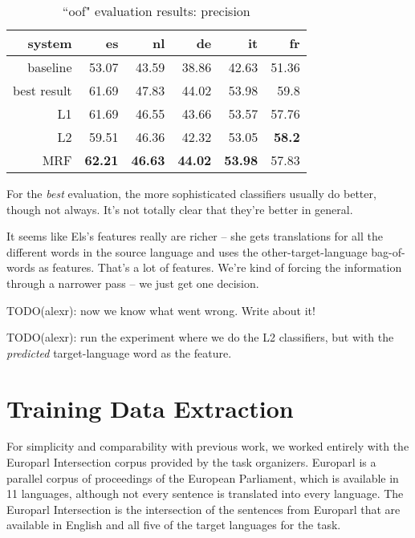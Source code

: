 \documentclass[11pt,letterpaper]{article}
\begin{document}
\begin{table*}[t!]
  \begin{center}
    \begin{tabular}{|r|r|r|r|r|r|}
      \hline
      system   & es    & nl    & de    &  it   & fr \\
      \hline
      baseline & 53.07          & 43.59              & 38.86          & 42.63          & 51.36 \\
   best result & 61.69          & 47.83              & 44.02          & 53.98          & 59.8 \\
      \hline
           L1  & 61.69          & 46.55              & 43.66          & 53.57          & 57.76 \\
           L2  & 59.51          & 46.36              & 42.32          & 53.05          & \textbf{58.2} \\
           MRF & \textbf{62.21} & \textbf{46.63}     & \textbf{44.02} & \textbf{53.98} & 57.83 \\
      \hline
    \end{tabular}
  \caption{``oof" evaluation results: precision}
  \label{table:resultsbest}
  \end{center}
\end{table*}

For the \emph{best} evaluation, the more sophisticated classifiers usually do
better, though not always. It's not totally clear that they're better in
general.

It seems like Els's features really are richer -- she gets translations for all
the different words in the source language and uses the other-target-language
bag-of-words as features. That's a lot of features. We're kind of forcing the
information through a narrower pass -- we just get one decision.

TODO(alexr): now we know what went wrong. Write about it!

TODO(alexr): run the experiment where we do the L2 classifiers, but with the
\emph{predicted} target-language word as the feature.


\section{Training Data Extraction}
For simplicity and comparability with previous work, we worked entirely with
the Europarl Intersection corpus provided by the task organizers.  Europarl
\cite{europarl} is a parallel corpus of proceedings of the European
Parliament, which is available in 11 languages, although not every sentence is
translated into every language. The Europarl Intersection is the intersection
of the sentences from Europarl that are available in English and all five of
the target languages for the task.
\end{document}
